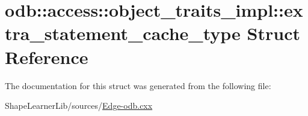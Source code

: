\hypertarget{structodb_1_1access_1_1object__traits__impl_1_1extra__statement__cache__type}{}\section{odb\+:\+:access\+:\+:object\+\_\+traits\+\_\+impl\+:\+:extra\+\_\+statement\+\_\+cache\+\_\+type Struct Reference}
\label{structodb_1_1access_1_1object__traits__impl_1_1extra__statement__cache__type}


The documentation for this struct was generated from the following file\+:\begin{DoxyCompactItemize}
\item 
Shape\+Learner\+Lib/sources/\hyperlink{_edge-odb_8cxx}{Edge-\/odb.\+cxx}\end{DoxyCompactItemize}
